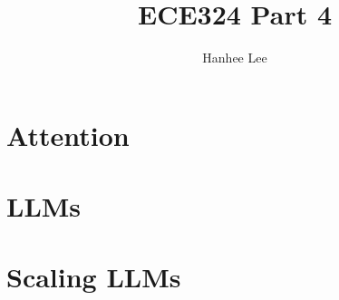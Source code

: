 \documentclass{article}
\title{ECE324 Part 4}
\author{Hanhee Lee}
\begin{document}
\section{Attention}

\newpage

\section{LLMs}

\newpage

\section{Scaling LLMs}

\newpage
\end{document}
